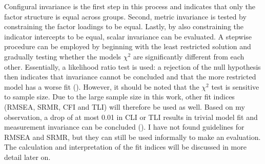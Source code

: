 \documentclass[11pt]{article}
\begin{document}
Configural invariance is the first step in this process and indicates that only the
factor structure is equal across groups. Second, metric invariance is tested by
constraining the factor loadings to be equal. Lastly, by also
constraining the indicator intercepts to be equal, scalar invariance can be
evaluated. A stepwise procedure can be employed by beginning with the least
restricted solution and gradually testing whether the models $\chi^2$ are
significantly different from each other. Essentially, a likelihood ratio test is
used: a rejection of the null hypothesis then indicates that invariance cannot
be concluded and that the more restricted model has a worse fit
(\cite{brown2015}). However, it should be noted that the $\chi^2$ test is
sensitive to sample size. Due to the large sample size in this work, other fit
indices (RMSEA, SRMR, CFI and TLI) will therefore be used as well. Based on my
observation, a drop of at most 0.01 in CLI or TLI results in trivial model fit
and measurement invariance can be concluded (\cite{chan2020}). I have not found
guidelines for RMSEA and SRMR, but they can still be used informally to make an
evaluation. The calculation and interpretation of the fit indices will be
discussed in more detail later on.

\begin{table}[h]
\captionsetup{singlelinecheck=off}
\caption{Sex measurement invariance}
\label{tab:sex_invariance}
\end{table}
\end{document}
